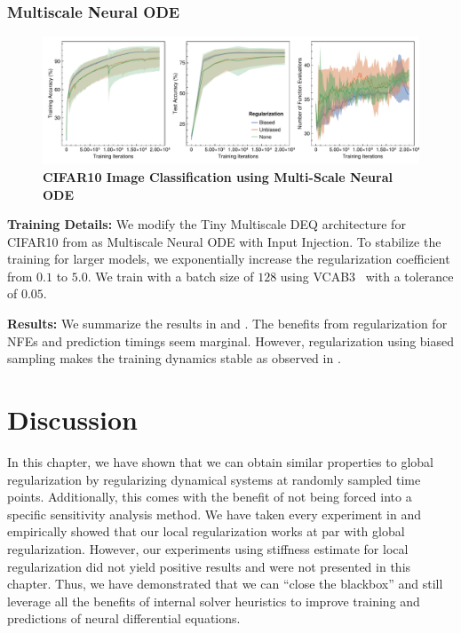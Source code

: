 \subsubsection{Multiscale Neural ODE}
\label{subsubsec:cifar10_msnode}

\begin{figure}[t]
  \centering
  \includegraphics[width=\linewidth]{../figures/local_regularizing_neural_des/cifar10_tiny_msnode.pdf}
  \caption{\textbf{CIFAR10 Image Classification using Multi-Scale Neural ODE}}
  \label{fig:cifar10_tiny_msnode_localreg}
\end{figure}

\textbf{Training Details:} We modify the Tiny Multiscale DEQ architecture for CIFAR10 from \citet{bai_multiscale_2020} as Multiscale Neural ODE with Input Injection. To stabilize the training for larger models, we exponentially increase the regularization coefficient from $0.1$ to $5.0$. We train with a batch size of $128$ using VCAB3~\citep{wanner1996solving} with a tolerance of $0.05$.

\textbf{Results:} We summarize the results in  and . The benefits from regularization for NFEs and prediction timings seem marginal. However, regularization using biased sampling makes the training dynamics stable as observed in .


\section{Discussion}
\label{sec:discussion_on_local_regularization_of_neural_des}

In this chapter, we have shown that we can obtain similar properties to global regularization by regularizing dynamical systems at randomly sampled time points. Additionally, this comes with the benefit of not being forced into a specific sensitivity analysis method. We have taken every experiment in \citet{pal2021opening} and empirically showed that our local regularization works at par with global regularization. However, our experiments using stiffness estimate for local regularization did not yield positive results and were not presented in this chapter. Thus, we have demonstrated that we can ``close the blackbox'' and still leverage all the benefits of internal solver heuristics to improve training and predictions of neural differential equations.

